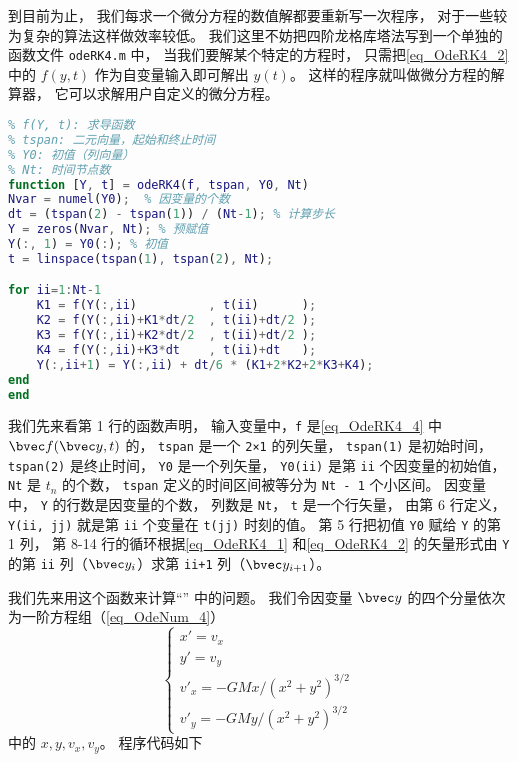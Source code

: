 到目前为止， 我们每求一个微分方程的数值解都要重新写一次程序， 对于一些较为复杂的算法这样做效率较低。 我们这里不妨把四阶龙格库塔法写到一个单独的函数文件 \verb`odeRK4.m` 中， 当我们要解某个特定的方程时， 只需把\autoref{eq_OdeRK4_2} 中的 $f(y, t)$ 作为自变量输入即可解出 $y(t)$。 这样的程序就叫做微分方程的解算器， 它可以求解用户自定义的微分方程。

\begin{lstlisting}[language=matlab, caption=odeRK4.m]
% 四阶龙格库塔定步长节微分方程
% f(Y, t): 求导函数
% tspan: 二元向量，起始和终止时间
% Y0: 初值（列向量）
% Nt: 时间节点数
function [Y, t] = odeRK4(f, tspan, Y0, Nt)
Nvar = numel(Y0);  % 因变量的个数
dt = (tspan(2) - tspan(1)) / (Nt-1); % 计算步长
Y = zeros(Nvar, Nt); % 预赋值
Y(:, 1) = Y0(:); % 初值
t = linspace(tspan(1), tspan(2), Nt);

for ii=1:Nt-1
    K1 = f(Y(:,ii)          , t(ii)      );
    K2 = f(Y(:,ii)+K1*dt/2  , t(ii)+dt/2 );
    K3 = f(Y(:,ii)+K2*dt/2  , t(ii)+dt/2 );
    K4 = f(Y(:,ii)+K3*dt    , t(ii)+dt   );
    Y(:,ii+1) = Y(:,ii) + dt/6 * (K1+2*K2+2*K3+K4);
end
end
\end{lstlisting}

我们先来看第 1 行的函数声明， 输入变量中，\verb`f` 是\autoref{eq_OdeRK4_4} 中 $\bvec f(\bvec y, t)$ 的， \verb`tspan` 是一个 \verb`2×1` 的列矢量， \verb`tspan(1)` 是初始时间， \verb`tspan(2)` 是终止时间， \verb`Y0` 是一个列矢量， \verb`Y0(ii)` 是第 \verb`ii` 个因变量的初始值， \verb`Nt` 是 $t_n$ 的个数， \verb`tspan` 定义的时间区间被等分为 \verb`Nt - 1` 个小区间。 因变量中， \verb`Y` 的行数是因变量的个数， 列数是 \verb`Nt`， \verb`t` 是一个行矢量， 由第 6 行定义， \verb`Y(ii, jj)` 就是第 \verb`ii` 个变量在 \verb`t(jj)` 时刻的值。 第 5 行把初值 \verb`Y0` 赋给 \verb`Y` 的第 1 列， 第 8-14 行的循环根据\autoref{eq_OdeRK4_1} 和\autoref{eq_OdeRK4_2} 的矢量形式由 \verb`Y` 的第 \verb`ii` 列（$\bvec y_i$）求第 \verb`ii+1` 列（$\bvec y_{i+1}$）。

我们先来用这个函数来计算“” 中的问题。 我们令因变量 $\bvec y$ 的四个分量依次为一阶方程组（\autoref{eq_OdeNum_4}）
\begin{equation}\label{eq_OdeRK4_5}
\begin{cases}
x' = v_x\\
y' = v_y\\
v'_x = -GMx/(x^2 + y^2)^{3/2}\\
v'_y = -GMy/(x^2 + y^2)^{3/2}
\end{cases}~
\end{equation}
中的 $x, y, v_x, v_y$。 程序代码如下

